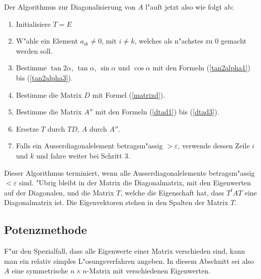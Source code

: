 Der Algorithmus zur Diagonalisierung von $A$ l"auft jetzt also
wie folgt ab:
\begin{enumerate}
\item Initialisiere $T=E$
\item W"ahle ein Element $a_{ik}\ne 0$, mit $i\ne k$, welches als
n"achstes zu $0$ gemacht werden soll.
\item Bestimme $\tan2\alpha$, $\tan\alpha$, $\sin\alpha$ und $\cos\alpha$
mit den Formeln (\ref{tan2alpha1}) bis (\ref{tan2alpha3}).
\item Bestimme die Matrix $D$ mit Formel (\ref{matrixd}).
\item Bestimme die Matrix $A''$ mit den Formeln (\ref{dtad1}) bis
(\ref{dtad3}).
\item Ersetze $T$ durch $TD$, $A$ durch $A''$.
\item Falls ein Ausserdiagonalelement betragsm"assig $>\varepsilon$,
verwende dessen Zeile $i$ und $k$ und fahre weiter bei Schritt 3.
\end{enumerate}
Dieser Algorithmus terminiert, wenn alle Ausserdiagonalelemente 
betragsm"assig $<\varepsilon$ sind.
"Ubrig bleibt in der Matrix
die Diagonalmatrix, mit den Eigenwerten auf der Diagonalen, 
und die Matrix $T$, welche die Eigenschaft hat, dass $T^tAT$
eine Diagonalmatrix ist.
Die Eigenvektoren stehen in den Spalten der Matrix $T$.

\subsection{Potenzmethode\label{section:potenzmethode}}
F"ur den Spezialfall, dass alle Eigenwerte einer Matrix verschieden
sind, kann man ein relativ simples L"osungsverfahren angeben.
In diesem
Abschnitt sei also $A$ eine symmetrische $n\times n$-Matrix mit
verschiedenen Eigenwerten.

